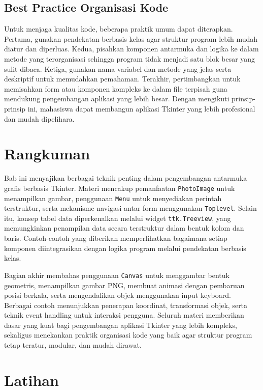 \subsection{Best Practice Organisasi Kode}
Untuk menjaga kualitas kode, beberapa praktik umum dapat diterapkan. Pertama, gunakan pendekatan berbasis kelas agar struktur program lebih mudah diatur dan diperluas. Kedua, pisahkan komponen antarmuka dan logika ke dalam metode yang terorganisasi sehingga program tidak menjadi satu blok besar yang sulit dibaca. Ketiga, gunakan nama variabel dan metode yang jelas serta deskriptif untuk memudahkan pemahaman. Terakhir, pertimbangkan untuk memisahkan form atau komponen kompleks ke dalam file terpisah guna mendukung pengembangan aplikasi yang lebih besar. Dengan mengikuti prinsip-prinsip ini, mahasiswa dapat membangun aplikasi Tkinter yang lebih profesional dan mudah dipelihara.


\section{Rangkuman}

Bab ini menyajikan berbagai teknik penting dalam pengembangan antarmuka grafis berbasis Tkinter. Materi mencakup pemanfaatan \texttt{PhotoImage} untuk menampilkan gambar, penggunaan \texttt{Menu} untuk menyediakan perintah terstruktur, serta mekanisme navigasi antar form menggunakan \texttt{Toplevel}. Selain itu, konsep tabel data diperkenalkan melalui widget \texttt{ttk.Treeview}, yang memungkinkan penampilan data secara terstruktur dalam bentuk kolom dan baris. Contoh-contoh yang diberikan memperlihatkan bagaimana setiap komponen diintegrasikan dengan logika program melalui pendekatan berbasis kelas.

Bagian akhir membahas penggunaan \texttt{Canvas} untuk menggambar bentuk geometris, menampilkan gambar PNG, membuat animasi dengan pembaruan posisi berkala, serta mengendalikan objek menggunakan input keyboard. Berbagai contoh menunjukkan penerapan koordinat, transformasi objek, serta teknik event handling untuk interaksi pengguna. Seluruh materi memberikan dasar yang kuat bagi pengembangan aplikasi Tkinter yang lebih kompleks, sekaligus menekankan praktik organisasi kode yang baik agar struktur program tetap teratur, modular, dan mudah dirawat.


\section{Latihan}


